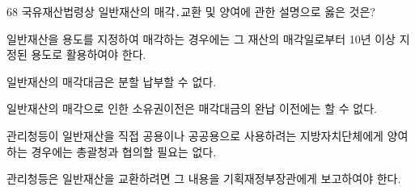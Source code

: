 \begin{question}{68}
국유재산법령상 일반재산의 매각․교환 및 양여에 관한 설명으로 옳은 것은?
\begin{choices}
  \item 일반재산을 용도를 지정하여 매각하는 경우에는 그 재산의 매각일로부터 10년 이상 지정된 용도로 활용하여야 한다.
  \item 일반재산의 매각대금은 분할 납부할 수 없다.
  \item 일반재산의 매각으로 인한 소유권이전은 매각대금의 완납 이전에는 할 수 없다.
  \item 관리청등이 일반재산을 직접 공용이나 공공용으로 사용하려는 지방자치단체에게 양여하는 경우에는 총괄청과 협의할 필요는 없다.
  \item 관리청등은 일반재산을 교환하려면 그 내용을 기획재정부장관에게 보고하여야 한다.
\end{choices}
\end{question}
